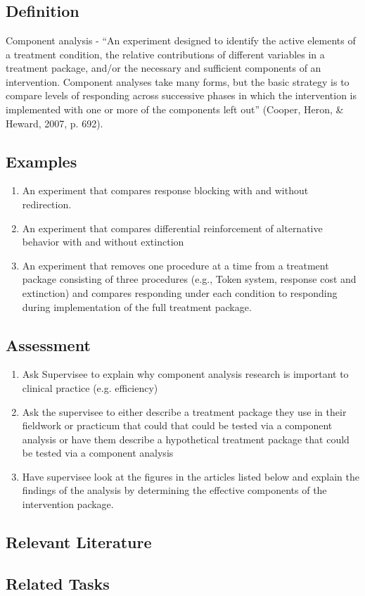 \clearpage \section[\fourbTen{}]{\fourbTen{}%
              }
\subsection{Definition}
Component analysis - ``An experiment designed to identify the active elements of a treatment condition, the relative contributions of different variables in a treatment package, and/or the necessary and sufficient components of an intervention. Component analyses take many forms, but the basic strategy is to compare levels of responding across successive phases in which the intervention is implemented with one or more of the components left out'' (Cooper, Heron, \& Heward, 2007, p. 692).
%
\subsection{Examples}
\begin{enumerate}
\item An experiment that compares response blocking with and without redirection. 
\item An experiment that compares differential reinforcement of alternative behavior with and without extinction
\item An experiment that removes one procedure at a time from a treatment package consisting of three procedures (e.g., Token system, response cost and extinction) and compares responding under each condition to responding during implementation of the full treatment package. 
\end{enumerate}
%
\subsection{Assessment}
\begin{enumerate}
\item Ask Supervisee to explain why component analysis research is important to clinical practice (e.g. efficiency)
\item Ask the supervisee to either describe a treatment package they use in their fieldwork or practicum that could that could be tested via a component analysis or have them describe a hypothetical treatment package that could be tested via a component analysis 
\item Have supervisee look at the figures in the articles listed below and explain the findings of the analysis by determining the effective components of the intervention package.
\end{enumerate}
%
\subsection{Relevant Literature}
\begin{refsection}
\nocite{cooper2007applied,hardesty2014effects,ward2010component,ward2012component}
\printbibliography[heading=none]
\end{refsection}
%
\subsection{Related Tasks} 
\fourbThree{}\\
